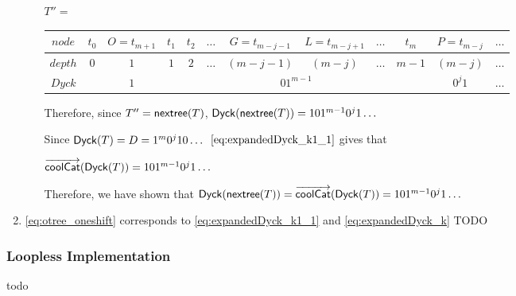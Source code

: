 \begin{enumerate}
\begin{itemize}
\bigskip
\bigskip


		$T''=$
		\begin{center}
		\begin{tabular}{ |c|c|c|c|c|c|c|c|c|c|c|c| } 
		 \hline

		    $node$ & $t_0$ & $O=t_{m+1}$ & $t_1$ & $t_2$ & $\dots$ & $G=t_{m-j-1}$ & $L=t_{m-j+1}$ & $\dots$ & $t_m$ & $P=t_{m-j}$ & $\dots$ \\
		 \hline
		    $depth$ & $0$ & $1$ & $1$ & $2$ &$\dots$ & $(m-j-1)$ & $(m-j)$ & $\dots$ & $m-1$ & $(m-j)$   & $\dots$\\
		 \hline
		    $Dyck$ &  & $1$ &  \multicolumn{7}{|c|}{$01^{m-1}$} &  $0^{j}1$   & $\dots$\\
		 \hline
		\end{tabular}
		\end{center}


		\bigskip
		\bigskip




		Therefore, since $T''=\mathsf{nextree}{(T)}$, $\mathsf{Dyck}{(\mathsf{nextree}{(T)})}=101^{m-1}0^j1\dots$

		Since $\mathsf{Dyck}{(T)}=D=1^m0^{j}10\dots$
		$\ref{eq:expandedDyck_k1_1}$ gives that

		$\overrightarrow{\mathsf{coolCat}}{(\mathsf{Dyck}{(T)})}=101^{m-1}0^j1\dots$

		Therefore, we have shown that $\mathsf{Dyck}{(\mathsf{nextree}{(T)})}=\overrightarrow{\mathsf{coolCat}}{(\mathsf{Dyck}{(T)})}=101^{m-1}0^j1\dots$
	\end{itemize}

    \item \ref{eq:otree_oneshift} corresponds to \ref{eq:expandedDyck_k1_1} and \ref{eq:expandedDyck_k}
	TODO
\end{enumerate}



\subsubsection{Loopless Implementation}
todo
